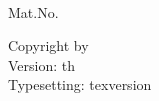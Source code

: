 \thispagestyle{empty}
\vspace*{3\baselineskip}
\noindent
\fullname\\
Mat.No. \matnr\\
\email


\vfill
\noindent
Copyright \thyear{} by \fullname\\
Version: \thday{}th \thmonth{} \thyear\\
Typesetting: {texversion}



\cleardoublepage
